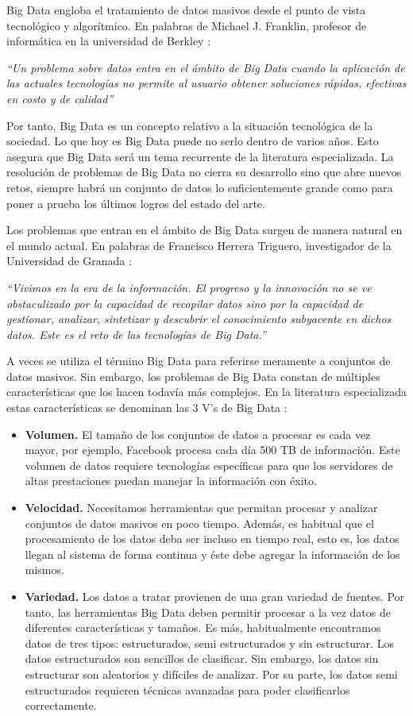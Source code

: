 \documentclass[10pt]{article}
\begin{document}
		Big Data engloba el tratamiento de datos masivos desde el punto de vista tecnológico y algorítmico. En palabras de Michael J. Franklin, profesor de informática en la universidad de Berkley \cite{bd-definition}:
		
		\textit{``Un problema sobre datos entra en el ámbito de Big Data cuando la aplicación de las actuales tecnologías no permite al usuario obtener soluciones  rápidas, efectivas en costo y de calidad''}
	
		Por tanto, Big Data es un concepto relativo a la situación tecnológica de la sociedad. Lo que hoy es Big Data puede no serlo dentro de varios años. Esto asegura que Big Data será un tema recurrente de la literatura especializada. La resolución de problemas de Big Data no cierra su desarrollo sino que abre nuevos retos, siempre habrá un conjunto de datos lo suficientemente grande como para poner a prueba los últimos logros del estado del arte.
	
		Los problemas que entran en el ámbito de Big Data surgen de manera natural en el mundo actual. En palabras de Francisco Herrera Triguero, investigador de la Universidad de Granada  \cite{big-data-herrera}:
		
		\textit{``Vivimos en la era de la información. El progreso y la innovación no se ve obstaculizado por la capacidad de recopilar datos sino por la capacidad de gestionar, analizar, sintetizar y descubrir el conocimiento subyacente en dichos datos. Este es el reto de las tecnologías de Big Data.''}
		
		A veces se utiliza el término Big Data para referirse meramente a conjuntos de datos masivos. Sin embargo, los problemas de Big Data constan de múltiples características que los hacen todavía más complejos. En la literatura especializada estas características se denominan las 3 V's de Big Data \cite{big-data}:
	
		\begin{itemize}
			\item \textbf{Volumen.} El tamaño de los conjuntos de datos a procesar es cada vez mayor, por ejemplo, Facebook procesa cada día 500 TB de información. Este volumen de datos requiere tecnologías específicas para que los servidores de altas prestaciones puedan manejar la información con éxito.
			\item \textbf{Velocidad.} Necesitamos herramientas que permitan procesar y analizar conjuntos de datos masivos en poco tiempo. Además, es habitual que el procesamiento de los datos deba ser incluso en tiempo real, esto es, los datos llegan al sistema de forma continua y éste debe agregar la información de los mismos.
			\item \textbf{Variedad.} Los datos a tratar provienen de una gran variedad de fuentes. Por tanto, las herramientas Big Data deben permitir procesar a la vez datos de diferentes características y tamaños. Es más, habitualmente encontramos datos de tres tipos: estructurados, semi estructurados y sin estructurar. Los datos estructurados son sencillos de clasificar. Sin embargo, los datos sin estructurar son aleatorios y difíciles de analizar. Por su parte, los datos semi estructurados requieren técnicas avanzadas para poder clasificarlos correctamente.
		\end{itemize}
	
\end{document}
